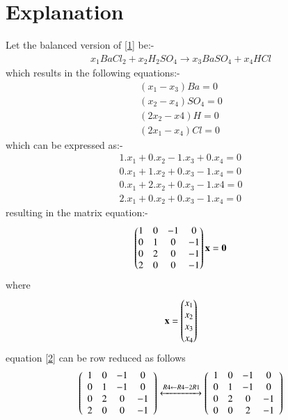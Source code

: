 \documentclass[journal,12pt,twocolumn]{IEEEtran}
\begin{document}
\section{Explanation}
Let the balanced version of \eqref{1} be:-
\begin{align}\label{3}
x_1BaCl_2 + x_2H_2SO_4 \xrightarrow{} x_3BaSO_4 + x_4HCl
\end{align}
which results in the following equations:-
\begin{equation}
 \begin{aligned}
    (x_1-x_3)Ba=0\\
    (x_2-x_4)SO_4=0\\
    (2x_2-x4)H=0\\
    (2x_1-x_4)Cl=0
 \end{aligned}
\end{equation}
which can be expressed as:-
\begin{equation}
 \begin{aligned}
    1.x_1 + 0.x_2 - 1.x_3 + 0.x_4=0\\
    0.x_1 + 1.x_2 + 0.x_3 - 1.x_4=0\\
    0.x_1 + 2.x_2 + 0.x_3 - 1.x4=0\\
    2.x_1 + 0.x_2 + 0.x_3 - 1.x_4=0
 \end{aligned}
\end{equation}
resulting in the matrix equation:-
\begin{align}\label{2}
    \begin{pmatrix}1 & 0 & -1 & 0\\0 & 1 & 0 & -1\\0 & 2 & 0 & -1\\2 & 0 & 0 & -1\end{pmatrix}\mathbf{x}=\mathbf{0}
\end{align}
where
\begin{align}
    \mathbf{x}=\begin{pmatrix}x_1\\x_2\\x_3\\x_4\end{pmatrix}
\end{align}
equation \eqref{2} can be row reduced as follows
\begin{align}
   \left(\begin{array}{cccc}  
 1 & 0 & -1 & 0\\  
 0 & 1 & -1 & 0\\
 0 & 2 & 0 & -1\\
 2 & 0 & 0 & -1
\end{array}\right)\xleftrightarrow[]{R4\leftarrow R4-2R1} \left(\begin{array}{cccc}
1 & 0 & -1 & 0\\
0 & 1 & -1 & 0\\
0 & 2 & 0 & -1\\
0 & 0 & 2 & -1
\end{array}\right)
\end{align}
\end{document}
